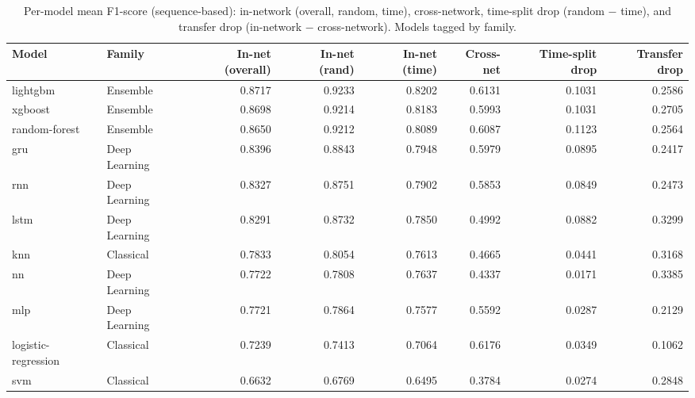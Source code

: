\begin{table}
\caption{Per-model mean F1-score (sequence-based): in-network (overall, random, time), cross-network, time-split drop (random $-$ time), and transfer drop (in-network $-$ cross-network). Models tagged by family.}
\label{tab:q6_per_model}
\begin{tabular}{llrrrrrr}
\toprule
Model & Family & In-net (overall) & In-net (rand) & In-net (time) & Cross-net & Time-split drop & Transfer drop \\
\midrule
lightgbm & Ensemble & 0.8717 & 0.9233 & 0.8202 & 0.6131 & 0.1031 & 0.2586 \\
xgboost & Ensemble & 0.8698 & 0.9214 & 0.8183 & 0.5993 & 0.1031 & 0.2705 \\
random-forest & Ensemble & 0.8650 & 0.9212 & 0.8089 & 0.6087 & 0.1123 & 0.2564 \\
gru & Deep Learning & 0.8396 & 0.8843 & 0.7948 & 0.5979 & 0.0895 & 0.2417 \\
rnn & Deep Learning & 0.8327 & 0.8751 & 0.7902 & 0.5853 & 0.0849 & 0.2473 \\
lstm & Deep Learning & 0.8291 & 0.8732 & 0.7850 & 0.4992 & 0.0882 & 0.3299 \\
knn & Classical & 0.7833 & 0.8054 & 0.7613 & 0.4665 & 0.0441 & 0.3168 \\
nn & Deep Learning & 0.7722 & 0.7808 & 0.7637 & 0.4337 & 0.0171 & 0.3385 \\
mlp & Deep Learning & 0.7721 & 0.7864 & 0.7577 & 0.5592 & 0.0287 & 0.2129 \\
logistic-regression & Classical & 0.7239 & 0.7413 & 0.7064 & 0.6176 & 0.0349 & 0.1062 \\
svm & Classical & 0.6632 & 0.6769 & 0.6495 & 0.3784 & 0.0274 & 0.2848 \\
\bottomrule
\end{tabular}
\end{table}
